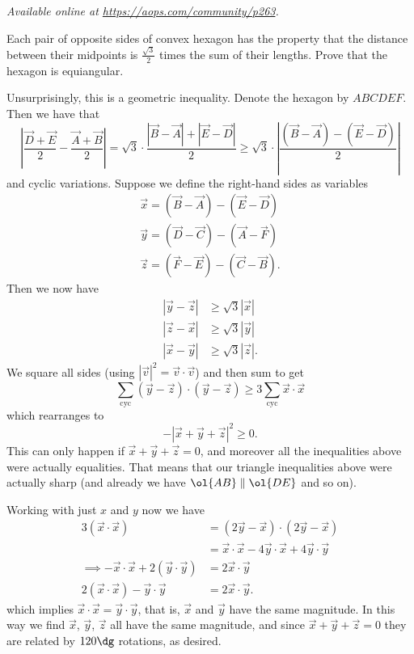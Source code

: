 \textsl{Available online at \url{https://aops.com/community/p263}.}
\begin{mdframed}[style=mdpurplebox,frametitle={Problem statement}]
Each pair of opposite sides of convex hexagon has the property that
the distance between their midpoints is $\frac{\sqrt3}{2}$
times the sum of their lengths.
Prove that the hexagon is equiangular.
\end{mdframed}
Unsurprisingly, this is a geometric inequality.
Denote the hexagon by $ABCDEF$.
Then we have that
\[
  \left\lvert
  \frac{\vec D + \vec E}{2} - \frac{\vec A + \vec B}{2}
  \right\rvert
  = \sqrt3 \cdot \frac{\left\lvert \vec B - \vec A \right\rvert
    + \left\lvert \vec E - \vec D \right\rvert}{2}
  \ge \sqrt 3 \cdot
  \left\lvert \frac{(\vec B - \vec A) - (\vec E - \vec D)}{2}  \right\rvert
\]
and cyclic variations.
Suppose we define the right-hand sides as variables
\begin{align*}
  \vec x = (\vec B - \vec A) - (\vec E - \vec D) \\
  \vec y = (\vec D - \vec C) - (\vec A - \vec F) \\
  \vec z = (\vec F - \vec E) - (\vec C - \vec B).
\end{align*}
Then we now have
\begin{align*}
  \left\lvert \vec y - \vec z \right\rvert
  &\ge \sqrt 3 \left\lvert \vec x  \right\rvert \\
  \left\lvert \vec z - \vec x \right\rvert
  &\ge \sqrt 3 \left\lvert \vec y  \right\rvert \\
  \left\lvert \vec x - \vec y \right\rvert
  &\ge \sqrt 3 \left\lvert \vec z  \right\rvert.
\end{align*}
We square all sides (using
$\left\lvert \vec v \right\rvert^2 = \vec v \cdot \vec v$)
and then sum to get
\[ \sum_{\text{cyc}} (\vec y - \vec z) \cdot (\vec y - \vec z)
  \ge 3 \sum_{\text{cyc}} \vec x \cdot \vec x \]
which rearranges to
\[- \left\lvert \vec x + \vec y + \vec z \right\rvert^2 \ge 0. \]
This can only happen if $\vec x + \vec y + \vec z =0$,
and moreover all the inequalities above were actually equalities.
That means that our triangle inequalities above were actually sharp
(and already we have $\ol{AB} \parallel \ol{DE}$ and so on).

Working with just $x$ and $y$ now we have
\begin{align*}
  3 (\vec x \cdot \vec x) &= (2 \vec y - \vec x) \cdot (2 \vec y - \vec x) \\
  &= \vec x \cdot \vec x - 4 \vec y \cdot \vec x + 4 \vec y \cdot \vec y \\
  \implies
  -\vec x \cdot \vec x + 2 (\vec y \cdot \vec y) &= 2 \vec x \cdot \vec y \\
  2 (\vec x \cdot \vec x) - \vec y \cdot \vec y &= 2 \vec x \cdot \vec y.
\end{align*}
which implies $\vec x \cdot \vec x = \vec y \cdot \vec y$,
that is, $\vec x$ and $\vec y$ have the same magnitude.
In this way we find $\vec x$, $\vec y$, $\vec z$ all
have the same magnitude,
and since $\vec x + \vec y + \vec z = 0$
they are related by $120\dg$ rotations, as desired.


